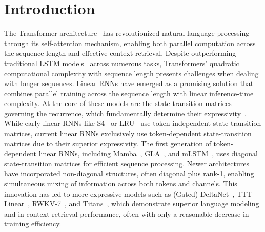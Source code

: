 \documentclass{article} %
\begin{document}
\section{Introduction}\label{sec:intro}
The Transformer architecture~\citep{vaswani-neurips17a} has revolutionized natural language processing through its self-attention mechanism, enabling both parallel computation across the sequence length and effective context retrieval. Despite outperforming traditional LSTM models~\citep{hochreiter1997long} across numerous tasks, Transformers' quadratic computational complexity with sequence length presents challenges when dealing with longer sequences. Linear RNNs have emerged as a promising solution that combines parallel training across the sequence length with linear inference-time complexity. At the core of these models are the state-transition matrices governing the recurrence, which fundamentally determine their expressivity~\citep{merrill-icml24a}. While early linear RNNs like S4~\citep{gu-iclr22a} or LRU~\citep{orvieto-icml23a} use token-independent state-transition matrices, current linear RNNs exclusively use token-dependent state-transition matrices due to their superior expressivity. The first generation of token-dependent linear RNNs, including Mamba~\citep{gu2023mamba,dao-icml24a}, GLA~\citep{yang-icml24a}, and mLSTM~\citep{beck-neurips24a}, uses diagonal state-transition matrices for efficient sequence processing. Newer architectures have incorporated non-diagonal structures, often diagonal plus rank-1, enabling simultaneous mixing of information across both tokens and channels. This innovation has led to more expressive models such as (Gated) DeltaNet~\citep{yang-neurips24a, yang-iclr25a}, TTT-Linear~\citep{sun-arxiv24a}, RWKV-7~\citep{peng2025rwkv7gooseexpressivedynamic}, and Titans~\citep{behrouz2024titans}, which demonstrate superior language modeling and in-context retrieval performance, often with only a reasonable decrease in training efficiency.
\end{document}
